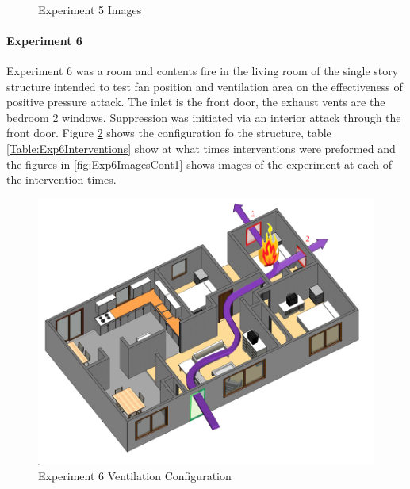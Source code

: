 \documentclass{article}
\begin{document}
\begin{figure}[H]
	\ContinuedFloat 
	\centering 
	 \ 
	\caption{Experiment 5 Images}
	\label{fig:Experiment5ImagesCont3} 
\end{figure}

\paragraph{Experiment 6}\mbox{}

Experiment 6 was a room and contents fire in the living room of the single story structure intended to test fan position and ventilation area on the effectiveness of positive pressure attack. The inlet is the front door, the exhaust vents are the bedroom 2 windows. Suppression was initiated via an interior attack through the front door. Figure \ref{fig:Exp6VentConfig} shows the configuration fo the structure, table \ref{Table:Exp6Interventions} show at what times interventions were preformed and the figures in \ref{fig:Exp6ImagesCont1} shows images of the experiment at each of the intervention times.

\begin{figure}[h!]
	\centering
	\includegraphics[width=5in]{0_Images/FireExperiments/Single_Story/Experiment_6.jpg}
	\caption{Experiment 6 Ventilation Configuration}
	\label{fig:Exp6VentConfig}
\end{figure}
\end{document}
